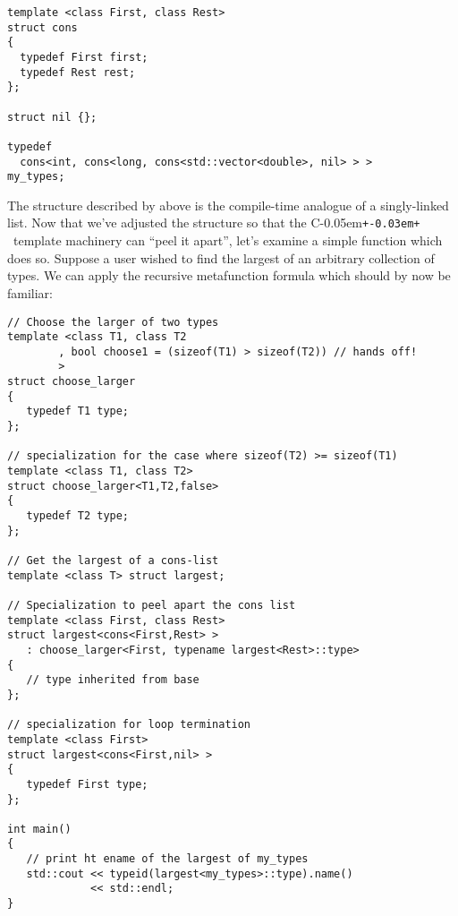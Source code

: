 \documentclass{netobjectdays}
\newcommand{\Cpp}{C\kern-0.05em\texttt{+\kern-0.03em+}%
}
\begin{document}
{\footnotesize
\begin{verbatim}
template <class First, class Rest>
struct cons
{
  typedef First first;
  typedef Rest rest;
};

struct nil {};

typedef
  cons<int, cons<long, cons<std::vector<double>, nil> > >
my_types;
\end{verbatim}
}

The structure described by  above is the compile-time
analogue of a singly-linked list. Now that we've adjusted the
structure so that the \Cpp\ template machinery can ``peel it apart'',
let's examine a simple function which does so. Suppose a user wished
to find the largest of an arbitrary collection of types. We can apply
the recursive metafunction formula which should by now be familiar:

{\footnotesize
\begin{verbatim}
// Choose the larger of two types
template <class T1, class T2
        , bool choose1 = (sizeof(T1) > sizeof(T2)) // hands off!
        >
struct choose_larger
{
   typedef T1 type;
};

// specialization for the case where sizeof(T2) >= sizeof(T1)
template <class T1, class T2>
struct choose_larger<T1,T2,false>
{
   typedef T2 type;
};

// Get the largest of a cons-list
template <class T> struct largest;

// Specialization to peel apart the cons list
template <class First, class Rest>
struct largest<cons<First,Rest> >
   : choose_larger<First, typename largest<Rest>::type>
{
   // type inherited from base
};

// specialization for loop termination
template <class First>
struct largest<cons<First,nil> >
{
   typedef First type;
};

int main()
{
   // print ht ename of the largest of my_types
   std::cout << typeid(largest<my_types>::type).name()
             << std::endl;
}

\end{verbatim}
}
\end{document}
